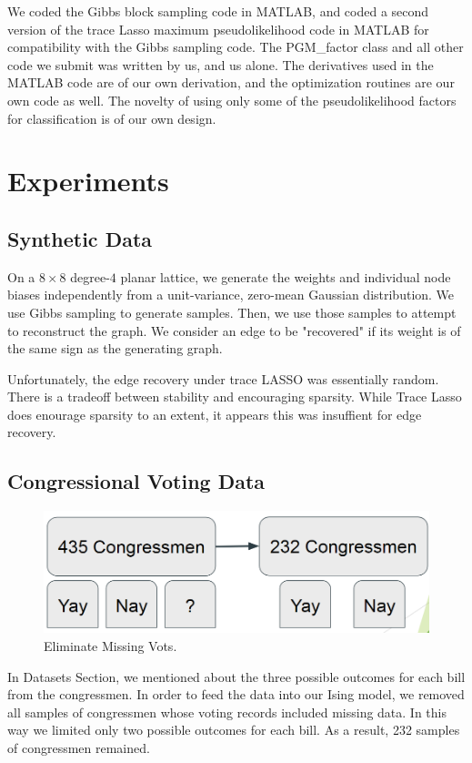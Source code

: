 \documentclass[11pt]{article}
\begin{document}
We coded the Gibbs block sampling code in MATLAB, and coded a second version of the trace Lasso maximum pseudolikelihood code in MATLAB for compatibility with the Gibbs sampling code. The PGM_factor class and all other code we submit was written by us, and us alone.  The derivatives used in the MATLAB code are of our own derivation, and the optimization routines are our own code as well. The novelty of using only some of the pseudolikelihood factors for classification is of our own design.

\section{Experiments}
\subsection{Synthetic Data}
On a $8\times8$ degree-$4$ planar lattice, we generate the weights and individual node biases independently from a unit-variance, zero-mean Gaussian distribution.
We use Gibbs sampling to generate samples.
Then, we use those samples to attempt to reconstruct the graph. We consider an edge to be "recovered" if its weight is of the same sign as the generating graph.

Unfortunately, the edge recovery under trace LASSO was essentially random. There is a tradeoff between stability and encouraging sparsity. While Trace Lasso does enourage sparsity to an extent, it appears this was insuffient for edge recovery.
  
\subsection{Congressional Voting Data}

\begin{figure}[h!]
\includegraphics[scale=0.5]{Congressmen}
\centering
\caption{Eliminate Missing Vots.}
\end{figure}

In Datasets Section, we mentioned about the three possible outcomes for each bill from the congressmen. In order to feed the data into our Ising model, we removed all samples of congressmen whose voting records included missing data. In this way we limited only two possible outcomes for each bill. As a result,  232 samples of congressmen remained. 
\end{document}
